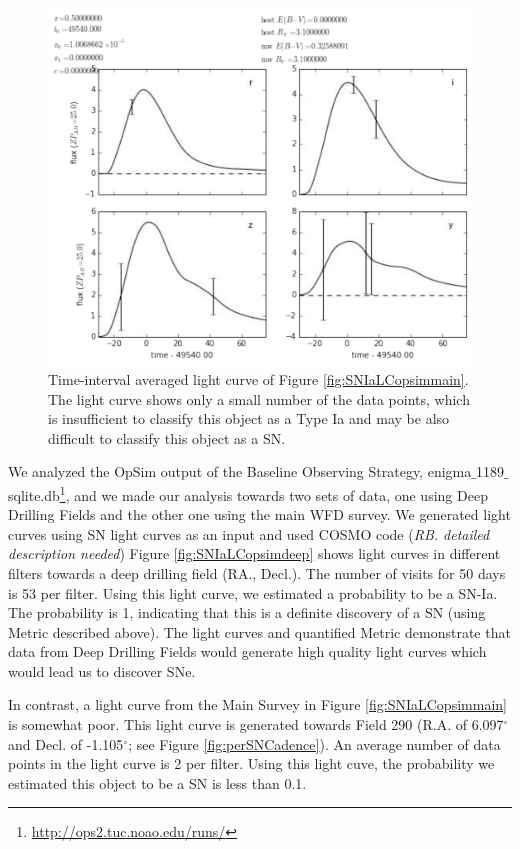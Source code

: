 \begin{figure}[tbh!]
\includegraphics[angle=0,width=0.99\hsize:,clip]{figs/SN_309_lcavg.pdf}
\caption{Time-interval averaged light curve of Figure \ref{fig:SNIaLCopsimmain}.
The light curve shows only a small number of the data points, which is insufficient
to classify this object as a Type Ia and may be also difficult to classify this object as
a SN. 
}
\label{fig:SNIaLCopsimmain2}
\end{figure}

We analyzed the OpSim output of the Baseline Observing Strategy,
enigma$\_$1189$\_$sqlite.db{\footnote {\url{http://ops2.tuc.noao.edu/runs/}}}, and we made
our analysis towards two sets of data, one using Deep Drilling Fields and the other one
using the main WFD survey. 
We generated light curves using SN light curves as an input and used COSMO code ({\it RB. detailed description needed}) 
Figure \ref{fig:SNIaLCopsimdeep} shows light curves in different
filters towards a deep drilling field (RA., Decl.). The number of visits for 50 days is 53
per filter. Using this light curve, we estimated a probability to be a SN-Ia.
The probability is 1, indicating that this is a definite discovery of a SN (using Metric
described above).   The light curves and quantified Metric demonstrate that data from Deep Drilling Fields
would generate high quality light curves which would lead us to discover SNe.

In contrast, a light curve from the Main Survey in Figure \ref{fig:SNIaLCopsimmain} is
somewhat poor. This light curve is generated towards Field 290 (R.A. of 6.097$^{\circ}$
and Decl. of -1.105$^{\circ}$; see Figure \ref{fig:perSNCadence}). An average number of
data points in the light curve is 2 per filter. Using this light cuve, the probability we
 estimated this object to be a SN is less than 0.1. 

